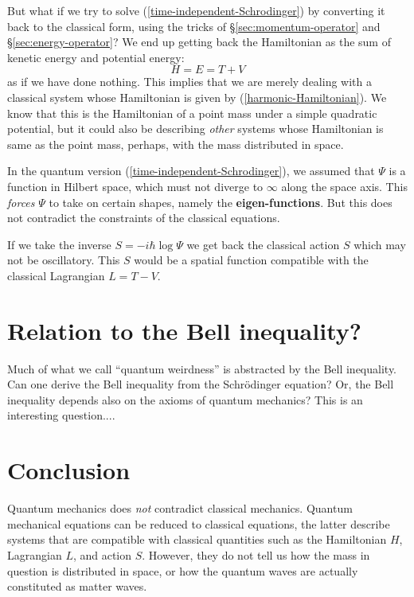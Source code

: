 But what if we try to solve (\ref{time-independent-Schrodinger}) by converting it back to the classical form, using the tricks of \S\ref{sec:momentum-operator} and \S\ref{sec:energy-operator}?  We end up getting back the Hamiltonian as the sum of kenetic energy and potential energy:
\begin{equation}
H = E = T + V
\end{equation}
as if we have done nothing.  This implies that we are merely dealing with a classical system whose Hamiltonian is given by (\ref{harmonic-Hamiltonian}).  We know that this is the Hamiltonian of a point mass under a simple quadratic potential, but it could also be describing \textit{other} systems whose Hamiltonian is same as the point mass, perhaps, with the mass distributed in space.

In the quantum version (\ref{time-independent-Schrodinger}), we assumed that $\Psi$ is a function in Hilbert space, which must not diverge to $\infty$ along the space axis.  This \textit{forces} $\Psi$ to take on certain shapes, namely the \textbf{eigen-functions}.  But this does not contradict the constraints of the classical equations.

If we take the inverse $S = - i \hbar \log \Psi$ we get back the classical action $S$ which may not be oscillatory.  This $S$ would be a spatial function compatible with the classical Lagrangian $L = T - V$.  

\section{Relation to the Bell inequality?}

Much of what we call ``quantum weirdness'' is abstracted by the Bell inequality.  Can one derive the Bell inequality from the Schr\"odinger equation?  Or, the Bell inequality depends also on the axioms of quantum mechanics?  This is an interesting question....

\section{Conclusion}

Quantum mechanics does \textit{not} contradict classical mechanics.  Quantum mechanical equations can be reduced to classical equations, the latter describe systems that are compatible with classical quantities such as the Hamiltonian $H$, Lagrangian $L$, and action $S$.  However, they do not tell us how the mass in question is distributed in space, or how the quantum waves are actually constituted as matter waves.

